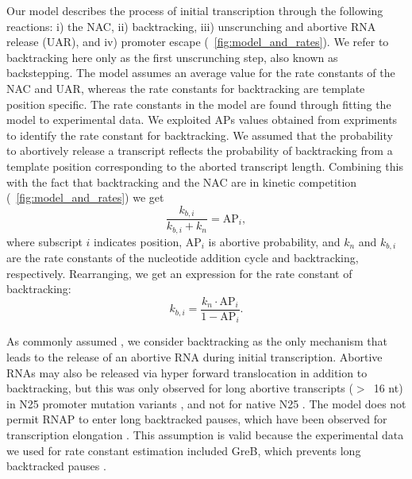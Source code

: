 %

Our model describes the process of initial transcription through the following
reactions: i) the NAC, ii) backtracking, iii) unscrunching and abortive RNA
release (UAR), and iv) promoter escape (\FIG~\ref{fig:model_and_rates}).  We
refer to backtracking here only as the first unscrunching step, also known as
backstepping. The model assumes an average value for the rate constants of the
NAC and UAR, whereas the rate constants for backtracking are template position
specific. The rate constants in the model are found through fitting the
model to experimental data. We exploited APs values obtained from expriments
\cite{hsu_quantitative_1996} to identify the rate constant for
backtracking. We assumed that
the probability to abortively release a transcript reflects the probability of
backtracking from a template position corresponding to the aborted transcript
length. Combining this with the fact that backtracking and the NAC are in
kinetic competition (\FIG~\ref{fig:model_and_rates}) we get
\begin{equation*}
  \frac{k_{b,i}}{k_{b,i} + k_n} = \text{AP}_i,
\end{equation*}
where subscript $i$ indicates position, AP$_i$ is abortive probability, and
$k_n$ and $k_{b,i}$ are the rate constants of the nucleotide addition cycle
and backtracking, respectively. Rearranging, we get an expression for the
rate constant of backtracking:
\begin{equation}
  k_{b,i} = \frac{k_n\cdot\text{AP}_i}{1-\text{AP}_i}.
  \label{eq:backtrackingcalc}
\end{equation}

As commonly assumed \cite{xue_kinetic_2008,tang_real-time_2009}, we consider
backtracking as the only mechanism that leads to the release of an abortive
RNA during initial transcription. Abortive RNAs may also be released via hyper
forward translocation in addition to backtracking, but this was only observed
for long abortive transcripts ($>$~16 nt) in N25 promoter mutation variants
\cite{chander_alternate_2007, chander_mechanisms_2015}, and not for native N25
\cite{chander_alternate_2007}. The model does not permit RNAP to enter long
backtracked pauses, which have been observed for transcription elongation
\cite{shaevitz_backtracking_2003}. This assumption is valid because the
experimental data we used for rate constant estimation included GreB, which
prevents long backtracked pauses \cite{revyakin_abortive_2006,
shaevitz_backtracking_2003}.

